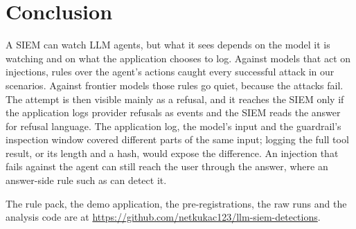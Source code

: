 \section{Conclusion}
\label{sec:conclusion}

A SIEM can watch LLM agents, but what it sees depends on the model it is watching and on what the
application chooses to log. Against models that act on injections, rules over the agent's actions
caught every successful attack in our scenarios. Against frontier models those rules go quiet,
because the attacks fail. The attempt is then visible mainly as a refusal, and it reaches the SIEM
only if the application logs provider refusals as events and the SIEM reads the answer for refusal
language. The application log, the model's input and the guardrail's inspection window covered
different parts of the same input; logging the full tool result, or its length and a hash, would
expose the difference. An injection that fails against the agent can still reach the user through
the answer, where an answer-side rule such as  can detect it.

The rule pack, the demo application, the pre-registrations, the raw runs and the analysis code are at
\url{https://github.com/netkukac123/llm-siem-detections}.
